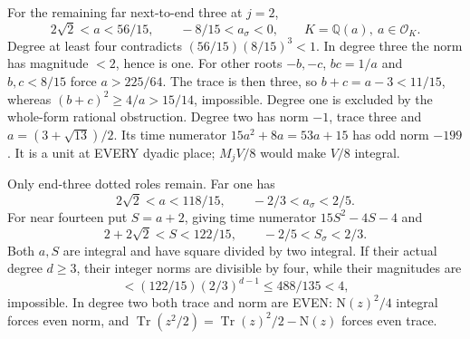 For the remaining far next-to-end three at \(j=2\),
\[
 2\sqrt2<a<56/15,\qquad
 -8/15<a_\sigma<0,\qquad K=\mathbb Q(a),\ a\in\mathcal O_K .
\]
Degree at least four contradicts
\((56/15)(8/15)^3<1\).
In degree three the norm has magnitude \(<2\), hence
is one.
For other roots \(-b,-c\), \(bc=1/a\) and
\(b,c<8/15\) force \(a>225/64\).
The trace is then three, so
\(b+c=a-3<11/15\), whereas
\((b+c)^2\ge4/a>15/14\), impossible.
Degree one is excluded by the whole-form rational obstruction.
Degree two has norm \(-1\), trace three and
\(a=(3+\sqrt{13})/2\).
Its time numerator \(15a^2+8a=53a+15\)
has odd norm \(-199\).
It is a unit at EVERY dyadic place;
\(M_jV/8\) would make \(V/8\) integral.

Only end-three dotted roles remain.
Far one has
\[
 2\sqrt2<a<118/15,\qquad -2/3<a_\sigma<2/5 .
\]
For near fourteen put \(S=a+2\), giving time numerator
\(15S^2-4S-4\) and
\[
 2+2\sqrt2<S<122/15,\qquad -2/5<S_\sigma<2/3 .
\]
Both \(a,S\) are integral and have square divided
by two integral.
If their actual degree \(d\ge3\), their integer norms
are divisible by four, while their magnitudes are
\[
                   <(122/15)(2/3)^{d-1}\le488/135<4,
\]
impossible.
In degree two both trace and norm are EVEN:
\(\mathrm N(z)^2/4\) integral forces even norm, and
\(\operatorname{Tr}(z^2/2)
 =\operatorname{Tr}(z)^2/2-\mathrm N(z)\)
forces even trace.

